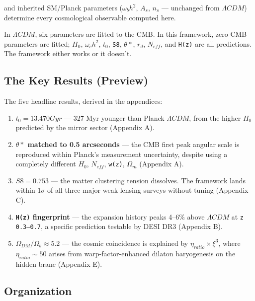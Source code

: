 \documentclass[aps,prd,preprint,superscriptaddress,longbibliography]{revtex4-2}
\begin{document}
and inherited SM/Planck parameters ($\omega_b h^{2}$, $A_s$, $n_s$ --- unchanged from $\Lambda CDM$) determine every cosmological observable computed here.

In $\Lambda CDM$, six parameters are fitted to the CMB. In this framework, zero CMB parameters are fitted; $H_{0}$, $\omega_c h^{2}$, $t_{0}$, \texttt{S8}, $\theta*$, $r_d$, $N_{eff}$, and \texttt{H(z)} are all predictions. The framework either works or it doesn't.


\subsection{The Key Results (Preview)}

The five headline results, derived in the appendices:


\begin{enumerate}
  \item \textbf{$t_{0} = 13.470 Gyr$} --- 327 Myr younger than Planck $\Lambda CDM$, from the higher $H_{0}$ predicted by the mirror sector (Appendix A).
  \item \textbf{$\theta*$ matched to 0.5 arcseconds} --- the CMB first peak angular scale is reproduced within Planck's measurement uncertainty, despite using a completely different {$H_{0}$, $N_{eff}$, \texttt{w(z)}, $\Omega_m$} (Appendix A).
  \item \textbf{$S8 = 0.753$} --- the matter clustering tension dissolves. The framework lands within $1\sigma$ of all three major weak lensing surveys without tuning (Appendix C).
  \item \textbf{\texttt{H(z)} fingerprint} --- the expansion history peaks 4--6\% above $\Lambda CDM$ at \texttt{z ~ 0.3--0.7}, a specific prediction testable by DESI DR3 (Appendix B).
  \item \textbf{$\Omega_{DM}/\Omega_b \approx 5.2$} --- the cosmic coincidence is explained by $\eta_{ratio} \times \xi^{3}$, where $\eta_{ratio} \sim  50$ arises from warp-factor-enhanced dilaton baryogenesis on the hidden brane (Appendix E).
\end{enumerate}


\subsection{Organization}
\end{document}
